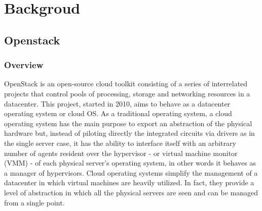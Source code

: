 \chapter{Backgroud}
\label{chap:Utilized Tools}

\section{Openstack}
\label{sec:openstack}
\subsection{Overview}
OpenStack\cite{OpenStackwebsite} is an open-source cloud toolkit consisting of a series of interrelated projects that control pools of processing, storage and networking resources in a datacenter.
This project, started in 2010, aims to behave as a datacenter operating system or cloud OS.
As a traditional operating system, a cloud operating system has the main purpose to export an abstraction of the physical hardware but, instead of piloting directly the integrated circuits via drivers as in the single server case, it has the ability to interface itself with an arbitrary number of agents resident over the hypervisor - or virtual machine monitor (VMM) - of each physical server's operating system, in other words it behaves as a manager of hypervisors.
Cloud operating systems simplify the management of a datacenter in which virtual machines are heavily utilized. In fact, they provide a level of abstraction in which all the physical servers are seen and can be managed from a single point.


